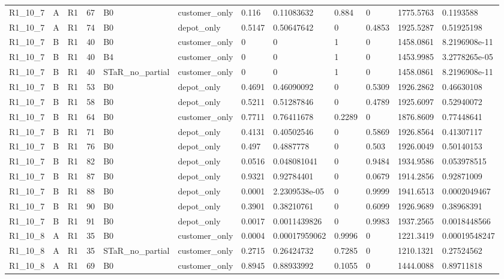 \begin{longtable}{llllllllllll}
R1\_10\_7 & A & R1 & 67 & B0 & customer\_only & 0.116 & 0.11083632 & 0.884 & 0 & 1775.5763 & 0.1193588 \\
R1\_10\_7 & A & R1 & 74 & B0 & depot\_only & 0.5147 & 0.50647642 & 0 & 0.4853 & 1925.5287 & 0.51925198 \\
R1\_10\_7 & B & R1 & 40 & B0 & customer\_only & 0 & 0 & 1 & 0 & 1458.0861 & 8.2196908e-11 \\
R1\_10\_7 & B & R1 & 40 & B4 & customer\_only & 0 & 0 & 1 & 0 & 1453.9985 & 3.2778265e-05 \\
R1\_10\_7 & B & R1 & 40 & STaR\_no\_partial & customer\_only & 0 & 0 & 1 & 0 & 1458.0861 & 8.2196908e-11 \\
R1\_10\_7 & B & R1 & 53 & B0 & depot\_only & 0.4691 & 0.46090092 & 0 & 0.5309 & 1926.2862 & 0.46630108 \\
R1\_10\_7 & B & R1 & 58 & B0 & depot\_only & 0.5211 & 0.51287846 & 0 & 0.4789 & 1925.6097 & 0.52940072 \\
R1\_10\_7 & B & R1 & 64 & B0 & customer\_only & 0.7711 & 0.76411678 & 0.2289 & 0 & 1876.8609 & 0.77448641 \\
R1\_10\_7 & B & R1 & 71 & B0 & depot\_only & 0.4131 & 0.40502546 & 0 & 0.5869 & 1926.8564 & 0.41307117 \\
R1\_10\_7 & B & R1 & 76 & B0 & depot\_only & 0.497 & 0.4887778 & 0 & 0.503 & 1926.0049 & 0.50140153 \\
R1\_10\_7 & B & R1 & 82 & B0 & depot\_only & 0.0516 & 0.048081041 & 0 & 0.9484 & 1934.9586 & 0.053978515 \\
R1\_10\_7 & B & R1 & 87 & B0 & depot\_only & 0.9321 & 0.92784401 & 0 & 0.0679 & 1914.2856 & 0.92871009 \\
R1\_10\_7 & B & R1 & 88 & B0 & depot\_only & 0.0001 & 2.2309538e-05 & 0 & 0.9999 & 1941.6513 & 0.0002049467 \\
R1\_10\_7 & B & R1 & 90 & B0 & depot\_only & 0.3901 & 0.38210761 & 0 & 0.6099 & 1926.9689 & 0.38968391 \\
R1\_10\_7 & B & R1 & 91 & B0 & depot\_only & 0.0017 & 0.0011439826 & 0 & 0.9983 & 1937.2565 & 0.0018448566 \\
R1\_10\_8 & A & R1 & 35 & B0 & customer\_only & 0.0004 & 0.00017959062 & 0.9996 & 0 & 1221.3419 & 0.00019548247 \\
R1\_10\_8 & A & R1 & 35 & STaR\_no\_partial & customer\_only & 0.2715 & 0.26424732 & 0.7285 & 0 & 1210.1321 & 0.27524562 \\
R1\_10\_8 & A & R1 & 69 & B0 & customer\_only & 0.8945 & 0.88933992 & 0.1055 & 0 & 1444.0088 & 0.89711818 \\

\end{longtable}
